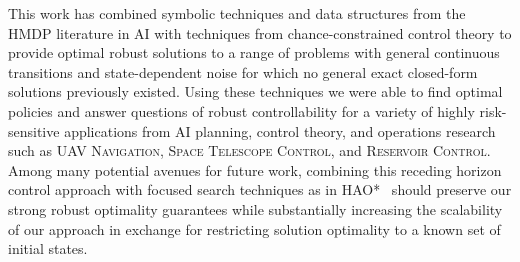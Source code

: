 %

This work has combined symbolic techniques and data structures from
the HMDP literature in AI with techniques from chance-constrained
control theory to provide optimal robust solutions to a range of
problems with general continuous transitions and state-dependent noise
for which no general exact closed-form solutions previously existed.
Using these techniques we were able to find optimal policies and
answer questions of robust controllability for a variety of highly
risk-sensitive applications from AI planning, control theory, and
operations research such as \textsc{UAV Navigation}, \textsc{Space
  Telescope Control}, and \textsc{Reservoir Control}.  Among many
potential avenues for future work, combining this receding horizon
control approach with focused search techniques as in HAO*~\cite{hao09}
should preserve our strong robust optimality guarantees while
substantially increasing the scalability of our approach in exchange
for restricting solution optimality to a known set of initial states.
